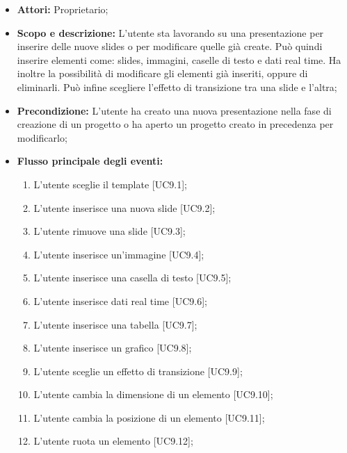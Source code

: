 \begin{itemize}
	\item \textbf{Attori:} Proprietario;
	\item \textbf{Scopo e descrizione:} L'utente sta lavorando su una presentazione per inserire delle nuove \gls{slides} o per modificare quelle già create. Può quindi inserire  elementi come: \gls{slides}, immagini, caselle di testo e dati \gls{real time}. Ha inoltre la possibilità di modificare gli elementi già inseriti, oppure di eliminarli. Può infine scegliere l'effetto di transizione tra una \gls{slide} e l'altra;
	\item \textbf{Precondizione:} L'utente ha creato una nuova presentazione nella fase di creazione di un progetto o ha aperto un progetto creato in precedenza per modificarlo;
	\item \textbf{Flusso principale degli eventi:}
	\begin{enumerate}
		\item L'utente sceglie il \gls{template} [UC9.1];
		
		\item L'utente inserisce una nuova \gls{slide} [UC9.2];
		
		\item L'utente rimuove una \gls{slide} [UC9.3];
		
		\item L'utente inserisce un'immagine [UC9.4];
		
		\item L'utente inserisce una casella di testo [UC9.5];
		
		\item L'utente inserisce dati \gls{real time} [UC9.6];
		
		\item L'utente inserisce una tabella [UC9.7];
		
		\item L'utente inserisce un grafico [UC9.8];
		
		\item L'utente sceglie un effetto di transizione [UC9.9];
		
		\item L'utente cambia la dimensione di un elemento [UC9.10];
		
		\item L'utente cambia la posizione di un elemento [UC9.11];
		
		\item L'utente ruota un elemento [UC9.12];
		

\end{enumerate}
\end{itemize}

